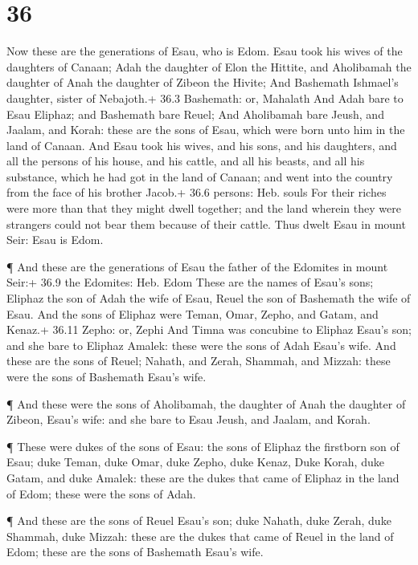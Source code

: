 \hypertarget{section-35}{%
\section{36}\label{section-35}}

 Now these are the generations of Esau, who is Edom.
 Esau took his wives of the daughters of Canaan; Adah the
daughter of Elon the Hittite, and Aholibamah the daughter of Anah the
daughter of Zibeon the Hivite;  And Bashemath Ishmael's
daughter, sister of Nebajoth.+ 36.3 Bashemath: or, Mahalath 
And Adah bare to Esau Eliphaz; and Bashemath bare Reuel; 
And Aholibamah bare Jeush, and Jaalam, and Korah: these are the sons of
Esau, which were born unto him in the land of Canaan.  And
Esau took his wives, and his sons, and his daughters, and all the
persons of his house, and his cattle, and all his beasts, and all his
substance, which he had got in the land of Canaan; and went into the
country from the face of his brother Jacob.+ 36.6 persons: Heb. souls
 For their riches were more than that they might dwell
together; and the land wherein they were strangers could not bear them
because of their cattle.  Thus dwelt Esau in mount Seir:
Esau is Edom.

 ¶ And these are the generations of Esau the father of the
Edomites in mount Seir:+ 36.9 the Edomites: Heb. Edom 
These are the names of Esau's sons; Eliphaz the son of Adah the wife of
Esau, Reuel the son of Bashemath the wife of Esau.  And the
sons of Eliphaz were Teman, Omar, Zepho, and Gatam, and Kenaz.+ 36.11
Zepho: or, Zephi  And Timna was concubine to Eliphaz Esau's
son; and she bare to Eliphaz Amalek: these were the sons of Adah Esau's
wife.  And these are the sons of Reuel; Nahath, and Zerah,
Shammah, and Mizzah: these were the sons of Bashemath Esau's wife.

 ¶ And these were the sons of Aholibamah, the daughter of
Anah the daughter of Zibeon, Esau's wife: and she bare to Esau Jeush,
and Jaalam, and Korah.

 ¶ These were dukes of the sons of Esau: the sons of
Eliphaz the firstborn son of Esau; duke Teman, duke Omar, duke Zepho,
duke Kenaz,  Duke Korah, duke Gatam, and duke Amalek: these
are the dukes that came of Eliphaz in the land of Edom; these were the
sons of Adah.

 ¶ And these are the sons of Reuel Esau's son; duke Nahath,
duke Zerah, duke Shammah, duke Mizzah: these are the dukes that came of
Reuel in the land of Edom; these are the sons of Bashemath Esau's wife.

